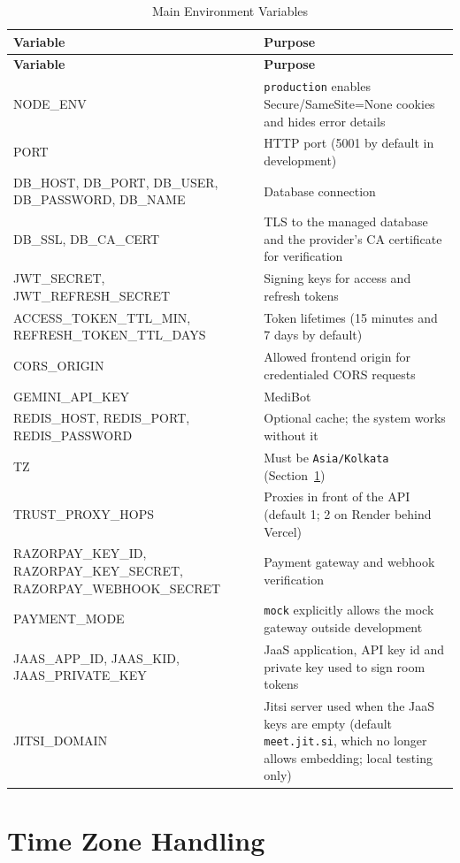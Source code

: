 \begin{longtable}{|L{5.3cm}|L{8.3cm}|}
\caption{Main Environment Variables} \label{tab:env} \\
\hline
{}
\textbf{Variable} & \textbf{Purpose} \\
\hline
\endfirsthead
\hline
\textbf{Variable} & \textbf{Purpose} \\
\hline
\endhead
NODE\_ENV & \texttt{production} enables Secure/SameSite=None cookies and hides error details \\
\hline
PORT & HTTP port (5001 by default in development) \\
\hline
DB\_HOST, DB\_PORT, DB\_USER, DB\_PASSWORD, DB\_NAME & Database connection \\
\hline
DB\_SSL, DB\_CA\_CERT & TLS to the managed database and the provider's CA certificate for verification \\
\hline
JWT\_SECRET, JWT\_REFRESH\_SECRET & Signing keys for access and refresh tokens \\
\hline
ACCESS\_TOKEN\_TTL\_MIN, REFRESH\_TOKEN\_TTL\_DAYS & Token lifetimes (15 minutes and 7 days by default) \\
\hline
CORS\_ORIGIN & Allowed frontend origin for credentialed CORS requests \\
\hline
GEMINI\_API\_KEY & MediBot \\
\hline
REDIS\_HOST, REDIS\_PORT, REDIS\_PASSWORD & Optional cache; the system works without it \\
\hline
TZ & Must be \texttt{Asia/Kolkata} (Section~\ref{sec:tz}) \\
\hline
TRUST\_PROXY\_HOPS & Proxies in front of the API (default 1; 2 on Render behind Vercel) \\
\hline
RAZORPAY\_KEY\_ID, RAZORPAY\_KEY\_SECRET, RAZORPAY\_WEBHOOK\_SECRET & Payment gateway and webhook verification \\
\hline
PAYMENT\_MODE & \texttt{mock} explicitly allows the mock gateway outside development \\
\hline
JAAS\_APP\_ID, JAAS\_KID, JAAS\_PRIVATE\_KEY & JaaS application, API key id and private key used to sign room tokens \\
\hline
JITSI\_DOMAIN & Jitsi server used when the JaaS keys are empty (default \texttt{meet.jit.si}, which no longer allows embedding; local testing only) \\
\hline
\end{longtable}

\FloatBarrier
\section{Time Zone Handling}
\label{sec:tz}

